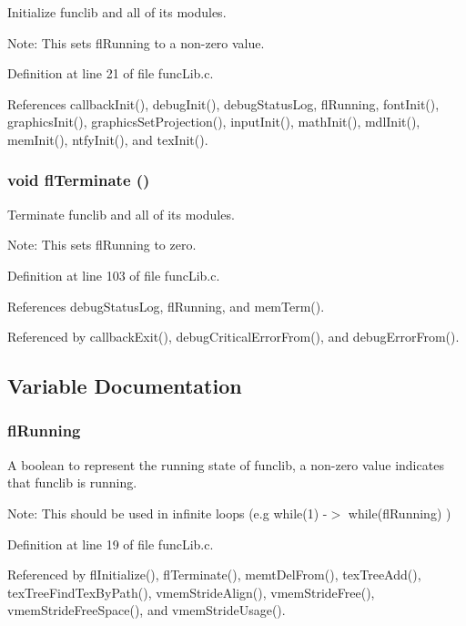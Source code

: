 Initialize funclib and all of its modules. 

\begin{Desc}
\item[Note:]This sets fl\-Running to a non-zero value. \end{Desc}


Definition at line 21 of file func\-Lib.c.

References callback\-Init(), debug\-Init(), debug\-Status\-Log, fl\-Running, font\-Init(), graphics\-Init(), graphics\-Set\-Projection(), input\-Init(), math\-Init(), mdl\-Init(), mem\-Init(), ntfy\-Init(), and tex\-Init().
\subsubsection{\setlength{\rightskip}{0pt plus 5cm}void fl\-Terminate ()}\label{funcLib_8h_3f1263fb36b6e7a11d53bafafb251729}


Terminate funclib and all of its modules. 

\begin{Desc}
\item[Note:]This sets fl\-Running to zero. \end{Desc}


Definition at line 103 of file func\-Lib.c.

References debug\-Status\-Log, fl\-Running, and mem\-Term().

Referenced by callback\-Exit(), debug\-Critical\-Error\-From(), and debug\-Error\-From().

\subsection{Variable Documentation}
\subsubsection{ {\bf fl\-Running}}\label{funcLib_8h_044d8733170ae7fcbfc6a4fd94c17dd8}


A boolean to represent the running state of funclib, a non-zero value indicates that funclib is running. 

\begin{Desc}
\item[Note:]This should be used in infinite loops (e.g while(1) -$>$ while(fl\-Running) ) \end{Desc}


Definition at line 19 of file func\-Lib.c.

Referenced by fl\-Initialize(), fl\-Terminate(), memt\-Del\-From(), tex\-Tree\-Add(), tex\-Tree\-Find\-Tex\-By\-Path(), vmem\-Stride\-Align(), vmem\-Stride\-Free(), vmem\-Stride\-Free\-Space(), and vmem\-Stride\-Usage().